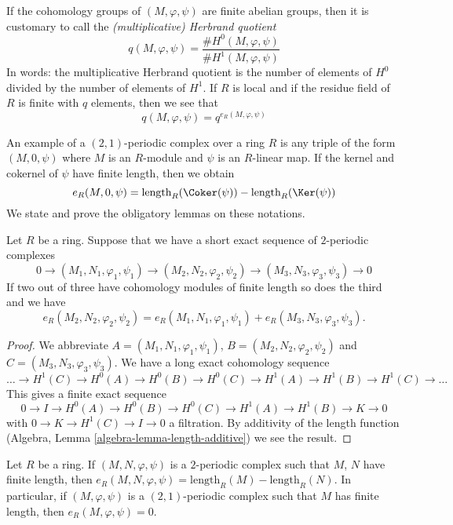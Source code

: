 \noindent
If the cohomology groups of $(M, \varphi, \psi)$
are finite abelian groups, then it is customary to call the
{\it (multiplicative) Herbrand quotient}
$$
q(M, \varphi, \psi) =
\frac{\# H^0(M, \varphi, \psi)}{\# H^1(M, \varphi, \psi)}
$$
In words: the multiplicative Herbrand quotient is the number of elements of
$H^0$ divided by the number of elements of $H^1$. If $R$ is local and if
the residue field of $R$ is finite with $q$ elements, then we see that
$$
q(M, \varphi, \psi) = q^{e_R(M, \varphi, \psi)}
$$

\medskip\noindent
An example of a $(2, 1)$-periodic complex over a ring $R$ is any triple of
the form $(M, 0, \psi)$ where $M$ is an $R$-module and $\psi$ is an
$R$-linear map. If the kernel and cokernel of $\psi$ have finite length,
then we obtain
\begin{equation}
\label{equation-multiplicity-coker-ker}
e_R(M, 0, \psi) = \text{length}_R(\Coker(\psi)) - \text{length}_R(\Ker(\psi))
\end{equation}
We state and prove the obligatory lemmas on these notations.

\begin{lemma}
\label{lemma-additivity-periodic-length}
Let $R$ be a ring. Suppose that we have a short exact sequence of
$2$-periodic complexes
$$
0 \to (M_1, N_1, \varphi_1, \psi_1)
\to (M_2, N_2, \varphi_2, \psi_2)
\to (M_3, N_3, \varphi_3, \psi_3)
\to 0
$$
If two out of three have cohomology modules of finite length so does
the third and we have
$$
e_R(M_2, N_2, \varphi_2, \psi_2) =
e_R(M_1, N_1, \varphi_1, \psi_1) +
e_R(M_3, N_3, \varphi_3, \psi_3).
$$
\end{lemma}

\begin{proof}
We abbreviate $A = (M_1, N_1, \varphi_1, \psi_1)$,
$B = (M_2, N_2, \varphi_2, \psi_2)$ and $C = (M_3, N_3, \varphi_3, \psi_3)$.
We have a long exact cohomology sequence
$$
\ldots
\to H^1(C)
\to H^0(A)
\to H^0(B)
\to H^0(C)
\to H^1(A)
\to H^1(B)
\to H^1(C)
\to \ldots
$$
This gives a finite exact sequence
$$
0 \to I
\to H^0(A)
\to H^0(B)
\to H^0(C)
\to H^1(A)
\to H^1(B)
\to K \to 0
$$
with $0 \to K \to H^1(C) \to I \to 0$ a filtration. By additivity of
the length function (Algebra, Lemma \ref{algebra-lemma-length-additive})
we see the result.
\end{proof}

\begin{lemma}
\label{lemma-finite-periodic-length}
Let $R$ be a ring. If $(M, N, \varphi, \psi)$ is a $2$-periodic complex
such that $M$, $N$ have finite length, then
$e_R(M, N, \varphi, \psi) = \text{length}_R(M) - \text{length}_R(N)$.
In particular, if $(M, \varphi, \psi)$ is a $(2, 1)$-periodic complex
such that $M$ has finite length, then
$e_R(M, \varphi, \psi) = 0$.
\end{lemma}

